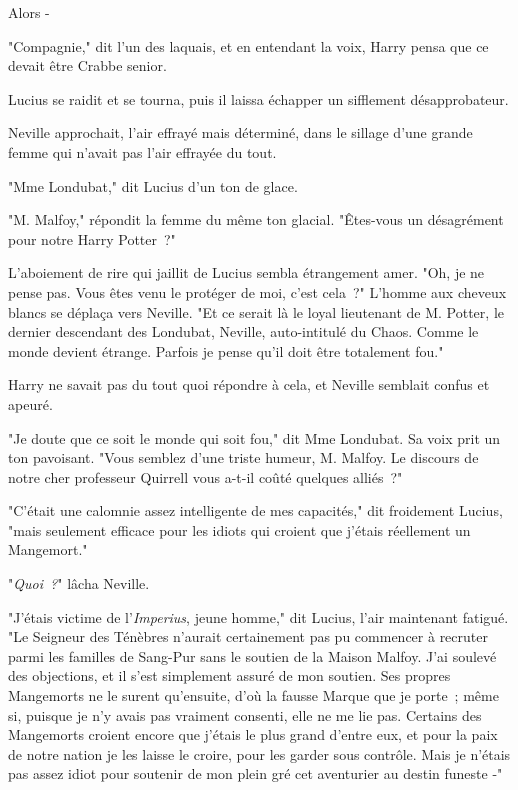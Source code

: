 Alors -

"Compagnie," dit l'un des laquais, et en entendant la voix, Harry pensa que ce devait être Crabbe senior.

Lucius se raidit et se tourna, puis il laissa échapper un sifflement désapprobateur.

Neville approchait, l'air effrayé mais déterminé, dans le sillage d'une grande femme qui n'avait pas l'air effrayée du tout.

"Mme Londubat," dit Lucius d'un ton de glace.

"M. Malfoy," répondit la femme du même ton glacial. "Êtes-vous un désagrément pour notre Harry Potter~?"

L'aboiement de rire qui jaillit de Lucius sembla étrangement amer. "Oh, je ne pense pas. Vous êtes venu le protéger de moi, c'est cela~?" L'homme aux cheveux blancs se déplaça vers Neville. "Et ce serait là le loyal lieutenant de M. Potter, le dernier descendant des Londubat, Neville, auto-intitulé du Chaos. Comme le monde devient étrange. Parfois je pense qu'il doit être totalement fou."

Harry ne savait pas du tout quoi répondre à cela, et Neville semblait confus et apeuré.

"Je doute que ce soit le monde qui soit fou," dit Mme Londubat. Sa voix prit un ton pavoisant. "Vous semblez d'une triste humeur, M. Malfoy. Le discours de notre cher professeur Quirrell vous a-t-il coûté quelques alliés~?"

"C'était une calomnie assez intelligente de mes capacités," dit froidement Lucius, "mais seulement efficace pour les idiots qui croient que j'étais réellement un Mangemort."

"\emph{Quoi~?}" lâcha Neville.

"J'étais victime de l'\emph{Imperius}, jeune homme," dit Lucius, l'air maintenant fatigué. "Le Seigneur des Ténèbres n'aurait certainement pas pu commencer à recruter parmi les familles de Sang-Pur sans le soutien de la Maison Malfoy. J'ai soulevé des objections, et il s'est simplement assuré de mon soutien. Ses propres Mangemorts ne le surent qu'ensuite, d'où la fausse Marque que je porte~; même si, puisque je n'y avais pas vraiment consenti, elle ne me lie pas. Certains des Mangemorts croient encore que j'étais le plus grand d'entre eux, et pour la paix de notre nation je les laisse le croire, pour les garder sous contrôle. Mais je n'étais pas assez idiot pour soutenir de mon plein gré cet aventurier au destin funeste -"

